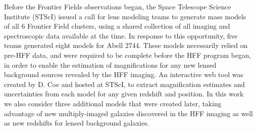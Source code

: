 Before the Frontier Fields observations began, the Space Telescope
Science Institute (STScI) issued a call for lens modeling teams to
generate mass models of all 6 Frontier Field clusters, using a shared
collection of all imaging and spectroscopic data available at the
time.  In response to this opportunity, five teams generated eight
models for Abell 2744.  These models necessarily relied on
pre-HFF data, and were required to be complete before the HFF program
began, in order to enable the estimation of magnifications for any new
lensed background sources revealed by the HFF imaging. An interactive
web tool was created by D. Coe and hosted at STScI, to extract
magnification estimates and uncertainties from each model for any
given redshift and position.  In this work we also consider three
additional models that were created later, taking advantage of new
multiply-imaged galaxies discovered in the HFF imaging as well as new
redshifts for lensed background galaxies.



